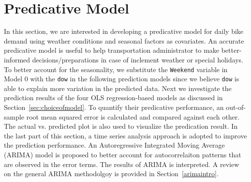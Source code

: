 \documentclass [11pt, proquest] {uwthesis}[2015/03/03]
\begin{document}
%
%



\section{Predicative Model}

In this section, we are interested in developing a predicative model for daily bike demand using weather conditions and seasonal factors as covariates. An accurate predicative model is useful to help transportation administrator to make better-informed decisions/preparations in case of inclement weather or special holidays. To better account for the seasonality, we substitute the \texttt{Weekend} variable in Model 0 with the \texttt{dow} in the following prediction models since we believe \texttt{dow} is able to explain more variation in the predicted data. Next we investigate the prediction results of the four OLS regression-based models as discussed in Section~\ref{sec:choiceofmodel}. To quantify their predicative performance, an out-of-sample root mean squared error is calculated and compared against each other. The actual vs. predicted plot is also used to visualize the predication result. In the last part of this section, a time series analysis approach is adopted to improve the prediction performance. An Autoregressive Integrated Moving Average (ARIMA) model is proposed to better account for autocorrelaiton patterns that are observed in the error terms. The results of ARIMA is interpreted. A review on the general ARIMA methodolgoy is provided in Section~\ref{arimaintro}.
\end{document}
